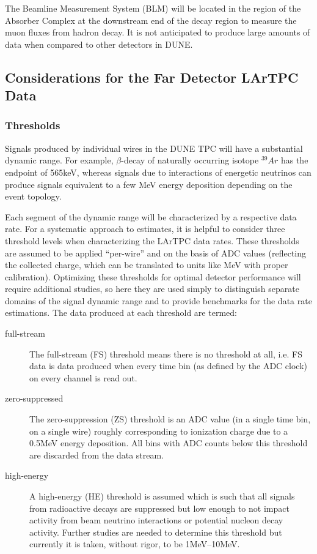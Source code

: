 The Beamline Measurement System (BLM) will be located in the region of the Absorber Complex
at the downstream end of the decay region to measure the muon fluxes from hadron decay.
It is not anticipated to produce large amounts of data when compared to other detectors in DUNE.

\subsection{Considerations for the Far Detector LArTPC Data}

\subsubsection{Thresholds}

Signals produced by individual wires in the DUNE TPC will have a substantial
dynamic range. For example, $\beta$-decay of naturally occurring isotope $^{39}Ar$ has the endpoint of
565keV, whereas signals due to interactions of energetic neutrinos can produce signals
equivalent to a few MeV energy deposition depending on the event topology.

Each segment of the dynamic range will be characterized by a respective data rate. 
For a systematic approach to estimates, it is helpful to consider
three threshold levels when characterizing the LArTPC data rates. These
thresholds are assumed to be applied ``per-wire'' and on the basis of ADC values (reflecting the collected charge, which can be translated to units like MeV with proper calibration). Optimizing these thresholds
for optimal detector performance will require additional studies, so here they are used simply
to distinguish separate domains of the signal dynamic range and to provide benchmarks for the data
rate estimations. The data produced at each threshold are termed:

\begin{description}
	
\item[full-stream] The full-stream (FS) threshold means there is no threshold at all, i.e.
FS data is data produced when every time bin (as defined by the ADC clock) on every channel is read out.

\item[zero-suppressed] The zero-suppression (ZS) threshold is an ADC value (in a single time bin,
on a single wire) roughly corresponding to ionization charge due to a 0.5MeV energy deposition.
All bins with ADC counts below this threshold are discarded from the data stream.

\item[high-energy] A high-energy (HE) threshold is assumed which is
  such that all signals from radioactive decays are suppressed but low
  enough to not impact activity from beam neutrino interactions or
  potential nucleon decay activity.
  Further studies are needed to determine this threshold but currently
  it is taken, without rigor, to be 1MeV--10MeV.
\end{description}



